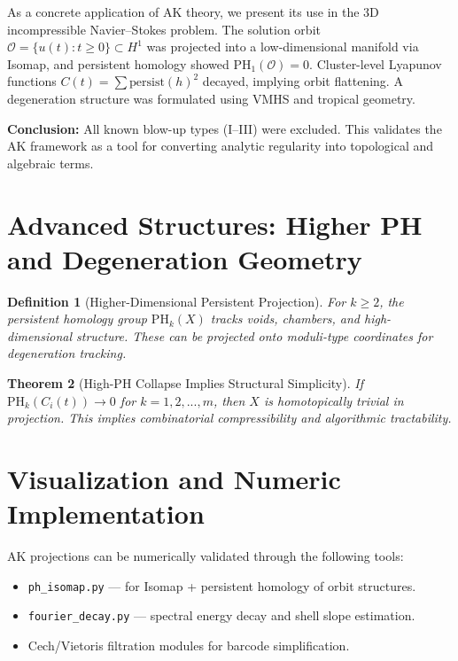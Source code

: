 \documentclass[11pt]{article}
\newtheorem{definition}{Definition}[section]
\newtheorem{theorem}[definition]{Theorem}
\begin{document}
As a concrete application of AK theory, we present its use in the 3D incompressible Navier--Stokes problem. The solution orbit $\mathcal{O} = \{u(t) : t \geq 0\} \subset H^1$ was projected into a low-dimensional manifold via Isomap, and persistent homology showed $\mathrm{PH}_1(\mathcal{O}) = 0$. Cluster-level Lyapunov functions $C(t) = \sum \mathrm{persist}(h)^2$ decayed, implying orbit flattening. A degeneration structure was formulated using VMHS and tropical geometry.

\textbf{Conclusion:} All known blow-up types (I--III) were excluded. This validates the AK framework as a tool for converting analytic regularity into topological and algebraic terms.

\section{Advanced Structures: Higher PH and Degeneration Geometry}

\begin{definition}[Higher-Dimensional Persistent Projection]
For $k \geq 2$, the persistent homology group $\mathrm{PH}_k(X)$ tracks voids, chambers, and high-dimensional structure. These can be projected onto moduli-type coordinates for degeneration tracking.
\end{definition}

\begin{theorem}[High-PH Collapse Implies Structural Simplicity]
If $\mathrm{PH}_k(C_i(t)) \to 0$ for $k=1,2,...,m$, then $X$ is homotopically trivial in projection. This implies combinatorial compressibility and algorithmic tractability.
\end{theorem}

\section{Visualization and Numeric Implementation}

AK projections can be numerically validated through the following tools:
\begin{itemize}
  \item \texttt{ph\_isomap.py} --- for Isomap + persistent homology of orbit structures.
  \item \texttt{fourier\_decay.py} --- spectral energy decay and shell slope estimation.
  \item Cech/Vietoris filtration modules for barcode simplification.
\end{itemize}
\end{document}
